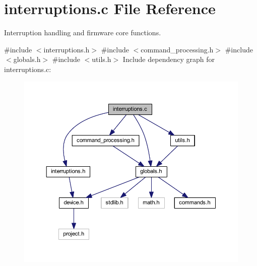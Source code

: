 \section{interruptions.\+c File Reference}
\label{interruptions_8c}


Interruption handling and firmware core functions.  


{\ttfamily \#include $<$interruptions.\+h$>$}\newline
{\ttfamily \#include $<$command\+\_\+processing.\+h$>$}\newline
{\ttfamily \#include $<$globals.\+h$>$}\newline
{\ttfamily \#include $<$utils.\+h$>$}\newline
Include dependency graph for interruptions.\+c\+:
\nopagebreak
\begin{figure}[H]
\begin{center}
\leavevmode
\includegraphics[width=350pt]{interruptions_8c__incl}
\end{center}
\end{figure}
